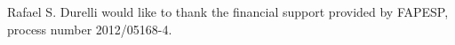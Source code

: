 Rafael S. Durelli would like to thank the financial support provided by FAPESP, process number 2012/05168-4. %